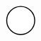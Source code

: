 \documentclass[10pt]{article}
\theoremstyle{plain}
\theoremstyle{remark}
\begin{document}
\[\begin{pgfpicture}
\begin{pgfscope}
\pgfpathcurveto{\pgfqpoint{3.089952in}{4.087526in}}{\pgfqpoint{3.039988in}{4.108222in}}{\pgfqpoint{2.987897in}{4.108222in}}%
\pgfpathcurveto{\pgfqpoint{2.935806in}{4.108222in}}{\pgfqpoint{2.885842in}{4.087526in}}{\pgfqpoint{2.849008in}{4.050692in}}%
\pgfpathcurveto{\pgfqpoint{2.812174in}{4.013858in}}{\pgfqpoint{2.791478in}{3.963894in}}{\pgfqpoint{2.791478in}{3.911803in}}%
\pgfpathcurveto{\pgfqpoint{2.791478in}{3.859712in}}{\pgfqpoint{2.812174in}{3.809748in}}{\pgfqpoint{2.849008in}{3.772914in}}%
\pgfpathcurveto{\pgfqpoint{2.885842in}{3.736081in}}{\pgfqpoint{2.935806in}{3.715385in}}{\pgfqpoint{2.987897in}{3.715385in}}%
\pgfpathclose%
\pgfusepath{stroke,fill}%
\end{pgfscope}%
\begin{pgfscope}%
\pgfsetbuttcap%
\pgfsetroundjoin%
\definecolor{currentfill}{rgb}{1.000000,1.000000,1.000000}%
\pgfsetfillcolor{currentfill}%
\pgfsetlinewidth{1.003750pt}%
\definecolor{currentstroke}{rgb}{0.000000,0.000000,0.000000}%
\pgfsetstrokecolor{currentstroke}%
\pgfsetdash{}{0pt}%
\pgfpathmoveto{\pgfqpoint{1.649116in}{3.715385in}}%
\pgfpathcurveto{\pgfqpoint{1.701207in}{3.715385in}}{\pgfqpoint{1.751171in}{3.736081in}}{\pgfqpoint{1.788005in}{3.772914in}}%
\pgfpathcurveto{\pgfqpoint{1.824839in}{3.809748in}}{\pgfqpoint{1.845535in}{3.859712in}}{\pgfqpoint{1.845535in}{3.911803in}}%
\pgfpathcurveto{\pgfqpoint{1.845535in}{3.963894in}}{\pgfqpoint{1.824839in}{4.013858in}}{\pgfqpoint{1.788005in}{4.050692in}}%
\pgfpathcurveto{\pgfqpoint{1.751171in}{4.087526in}}{\pgfqpoint{1.701207in}{4.108222in}}{\pgfqpoint{1.649116in}{4.108222in}}%
\pgfpathcurveto{\pgfqpoint{1.597026in}{4.108222in}}{\pgfqpoint{1.547061in}{4.087526in}}{\pgfqpoint{1.510227in}{4.050692in}}%
\pgfpathcurveto{\pgfqpoint{1.473394in}{4.013858in}}{\pgfqpoint{1.452698in}{3.963894in}}{\pgfqpoint{1.452698in}{3.911803in}}%
\pgfpathcurveto{\pgfqpoint{1.452698in}{3.859712in}}{\pgfqpoint{1.473394in}{3.809748in}}{\pgfqpoint{1.510227in}{3.772914in}}%
\pgfpathcurveto{\pgfqpoint{1.547061in}{3.736081in}}{\pgfqpoint{1.597026in}{3.715385in}}{\pgfqpoint{1.649116in}{3.715385in}}%
\pgfpathclose%
\pgfusepath{stroke,fill}%
\end{pgfscope}%
\begin{pgfscope}%
\pgfsetbuttcap%
\pgfsetroundjoin%
\definecolor{currentfill}{rgb}{1.000000,1.000000,1.000000}%
\pgfsetfillcolor{currentfill}%
\pgfsetlinewidth{1.003750pt}%
\definecolor{currentstroke}{rgb}{0.000000,0.000000,0.000000}%
\pgfsetstrokecolor{currentstroke}%
\pgfsetdash{}{0pt}%
\pgfpathmoveto{\pgfqpoint{1.638980in}{1.907692in}}%
\pgfpathcurveto{\pgfqpoint{1.691071in}{1.907692in}}{\pgfqpoint{1.741035in}{1.928388in}}{\pgfqpoint{1.777869in}{1.965222in}}%

\end{pgfscope}
\end{pgfpicture}\]
\end{document}

